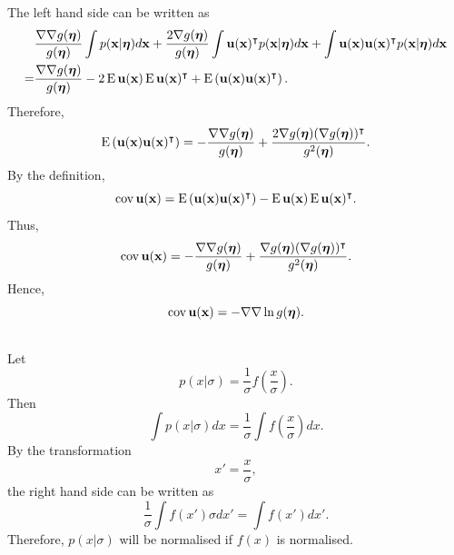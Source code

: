 %
The left hand side can be written as
%
\begin{equation}
\begin{aligned}
&
\frac{\nabla \nabla g(\bm{\eta})}{g(\bm{\eta})}
\int
p(\mathbf{x} | \bm{\eta})
d\mathbf{x}
+
\frac{2 \nabla g(\bm{\eta})}{g(\bm{\eta})}
\int
\mathbf{u}(\mathbf{x}) ^ \intercal
p(\mathbf{x} | \bm{\eta})
d\mathbf{x}
+
\int
\mathbf{u} (\mathbf{x})
\mathbf{u} (\mathbf{x}) ^ \intercal
p(\mathbf{x} | \bm{\eta})
d\mathbf{x} \\
=&
\frac{\nabla \nabla g(\bm{\eta})}{g(\bm{\eta})}
-
2
\operatorname{E} \mathbf{u} (\mathbf{x})
\operatorname{E} \mathbf{u} (\mathbf{x}) ^ \intercal
+
\operatorname{E} 
\left(
	\mathbf{u} (\mathbf{x}) 
	\mathbf{u} (\mathbf{x}) ^ \intercal
\right).
\end{aligned}
\end{equation}
%
Therefore,
%
\begin{equation}
\operatorname{E} 
\left(
	\mathbf{u} (\mathbf{x}) 
	\mathbf{u} (\mathbf{x}) ^ \intercal
\right)
=
-
\frac{\nabla \nabla g(\bm{\eta})}{g(\bm{\eta})}
+
\frac{2 \nabla g(\bm{\eta}) (\nabla g(\bm{\eta})) ^ \intercal}{g ^ 2 (\bm{\eta})}.
\end{equation}
%
By the definition,
%
\begin{equation}
\operatorname{cov} \mathbf{u} (\mathbf{x})
=
\operatorname{E} 
\left(
	\mathbf{u} (\mathbf{x}) 
	\mathbf{u} (\mathbf{x}) ^ \intercal
\right)
-
\operatorname{E} \mathbf{u} (\mathbf{x})
\operatorname{E} \mathbf{u} (\mathbf{x}) ^ \intercal.
\end{equation}
%
Thus,
%
\begin{equation}
\operatorname{cov} \mathbf{u} (\mathbf{x})
=
-
\frac{\nabla \nabla g(\bm{\eta})}{g(\bm{\eta})}
+
\frac
{\nabla g(\bm{\eta}) (\nabla g(\bm{\eta})) ^ \intercal}
{g ^ 2 (\bm{\eta})}.
\end{equation}
%
Hence,
%
\begin{equation}
\operatorname{cov} \mathbf{u} (\mathbf{x})
=
-
\nabla 
\nabla 
\ln g(\bm{\eta}).
\end{equation}
%


\subsection{}
\label{2.59}
Let 
%
\begin{equation}
p(x | \sigma)
=
\frac{1}{\sigma}
f
\left(
	\frac{x}{\sigma}
\right).
\end{equation}
%
Then
%
\begin{equation}
\int 
p(x | \sigma)
dx
=
\frac{1}{\sigma}
\int
f
\left(
	\frac{x}{\sigma}
\right)
dx.
\end{equation}
%
By the transformation
%
\begin{equation}
x' 
= 
\frac{x}{\sigma},
\end{equation}
%
the right hand side can be written as
%
\begin{equation}
\frac{1}{\sigma}
\int
f(x')
\sigma
dx'
=
\int
f(x')
dx'.
\end{equation}
%
Therefore, $p(x | \sigma)$ will be normalised if $f(x)$ is normalised.


